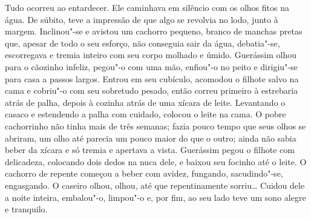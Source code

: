 Tudo ocorreu ao entardecer. Ele caminhava em silêncio com os olhos fitos
na água. De súbito, teve a impressão de que algo se revolvia no lodo,
junto à margem. Inclinou"-se e avistou um cachorro pequeno, branco de
manchas pretas que, apesar de todo o seu esforço, não conseguia sair da
água, debatia"-se, escorregava e tremia inteiro com seu corpo molhado e
úmido. Guerássim olhou para o cãozinho infeliz, pegou"-o com uma mão,
enfiou"-o no peito e dirigiu"-se para casa a passos largos. Entrou em seu
cubículo, acomodou o filhote salvo na cama e cobriu"-o com seu sobretudo
pesado, então correu primeiro à estrebaria atrás de palha, depois à
cozinha atrás de uma xícara de leite. Levantando o casaco e estendendo a
palha com cuidado, colocou o leite na cama. O pobre cachorrinho não
tinha mais de três semanas; fazia pouco tempo que seus olhos se abriram,
um olho até parecia um pouco maior do que o outro; ainda não sabia beber
da xícara e só tremia e apertava a vista. Guerássim pegou o filhote com
delicadeza, colocando dois dedos na nuca dele, e baixou seu focinho até
o leite. O cachorro de repente começou a beber com avidez, fungando,
sacudindo"-se, engasgando. O caseiro olhou, olhou, até que repentinamente
sorriu\ldots{} Cuidou dele a noite inteira, embalou"-o, limpou"-o e, por fim,
ao seu lado teve um sono alegre e tranquilo.

